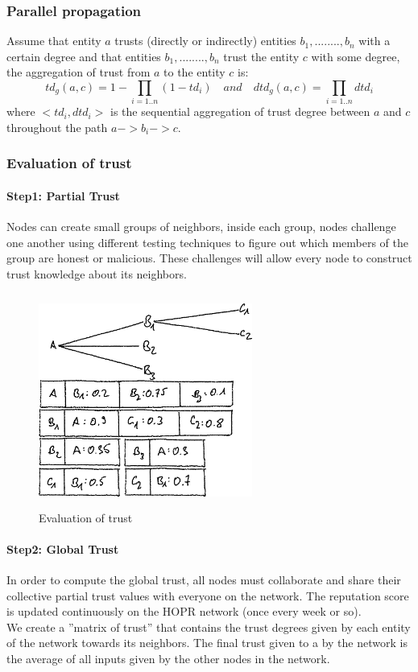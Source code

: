 \subsubsection*{Parallel propagation}
Assume that entity $a$ trusts (directly or indirectly) entities $b_1,........,b_n$ with a certain degree and that entities $b_1,........,b_n$ trust the entity $c$ with some degree, the aggregation of trust from $a$ to the entity $c$ is:
$$td_g(a,c)=1-\prod_{i=1..n}(1-td_i) \quad and \quad dtd_g(a,c)=\prod_{i=1..n}dtd_i$$
where $<td_i,dtd_i>$ is the sequential aggregation of trust degree between $a$ and $c$ throughout the path $a->b_i->c$.

\subsubsection{Evaluation of trust}
\paragraph{Step1: Partial Trust}
Nodes can create small groups of neighbors, inside each group, nodes challenge one another using different testing techniques to figure out which members of the group are honest or malicious. 
These challenges will allow every node to construct trust knowledge about its neighbors. 
\begin{figure}
    \centering
    \includegraphics[width=7cm,height=7cm,keepaspectratio]{../whitepaper/images/reputation.png}
    \caption{Evaluation of trust}
    \label{fig:Evaluation of trust}
\end{figure}

\paragraph{Step2: Global Trust}
In order to compute the global trust, all nodes must collaborate and share their collective partial trust values with everyone on the network. 
The reputation score is updated continuously on the HOPR network (once every week or so). 
\\We create a ”matrix of trust” that contains the trust degrees given by each entity of the network towards its neighbors. 
The final trust given to a by the network is the average of all inputs given by the other nodes in the network.





